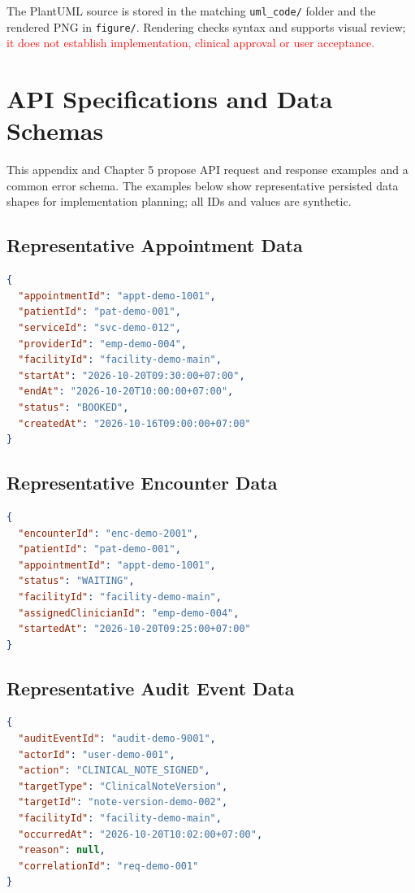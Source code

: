 \documentclass[a4paper,12pt]{article}
\newcommand{\code}[1]{\nolinkurl{#1}}
\newcommand{\weak}[1]{\textcolor{red}{#1}}
\begin{document}
The PlantUML source is stored in the matching \code{uml_code/} folder and the rendered PNG in \code{figure/}. Rendering checks syntax and supports visual review; \weak{it does not establish implementation, clinical approval or user acceptance.}

\section{API Specifications and Data Schemas}
This appendix and Chapter 5 propose API request and response examples and a common error schema. The examples below show representative persisted data shapes for implementation planning; all IDs and values are synthetic.

\subsection{Representative Appointment Data}
\begin{lstlisting}[language=json,caption={Proposed Appointment resource shape},label={lst:appointment-resource}]
{
  "appointmentId": "appt-demo-1001",
  "patientId": "pat-demo-001",
  "serviceId": "svc-demo-012",
  "providerId": "emp-demo-004",
  "facilityId": "facility-demo-main",
  "startAt": "2026-10-20T09:30:00+07:00",
  "endAt": "2026-10-20T10:00:00+07:00",
  "status": "BOOKED",
  "createdAt": "2026-10-16T09:00:00+07:00"
}
\end{lstlisting}

\subsection{Representative Encounter Data}
\begin{lstlisting}[language=json,caption={Proposed Encounter resource shape},label={lst:encounter-resource}]
{
  "encounterId": "enc-demo-2001",
  "patientId": "pat-demo-001",
  "appointmentId": "appt-demo-1001",
  "status": "WAITING",
  "facilityId": "facility-demo-main",
  "assignedClinicianId": "emp-demo-004",
  "startedAt": "2026-10-20T09:25:00+07:00"
}
\end{lstlisting}

\subsection{Representative Audit Event Data}
\begin{lstlisting}[language=json,caption={Proposed audit event shape with no clinical payload duplication},label={lst:audit-event-resource}]
{
  "auditEventId": "audit-demo-9001",
  "actorId": "user-demo-001",
  "action": "CLINICAL_NOTE_SIGNED",
  "targetType": "ClinicalNoteVersion",
  "targetId": "note-version-demo-002",
  "facilityId": "facility-demo-main",
  "occurredAt": "2026-10-20T10:02:00+07:00",
  "reason": null,
  "correlationId": "req-demo-001"
}
\end{lstlisting}
\end{document}
